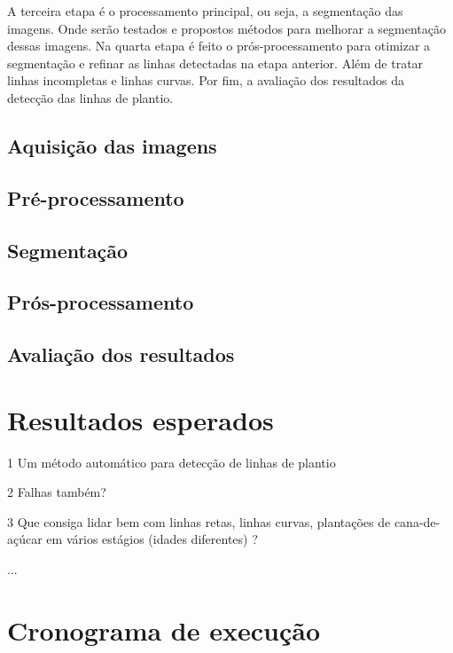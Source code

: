\documentclass[12pt, a4paper, english, brazil]{article}
\newcommand{\textBlue}[1]{{{\color{blue} #1}}}
\begin{document}
A terceira etapa é o processamento principal, ou seja, a segmentação das imagens. Onde serão testados e propostos métodos para melhorar a segmentação dessas imagens. Na quarta etapa é feito o prós-processamento para otimizar a segmentação e refinar as linhas detectadas na etapa anterior. Além de tratar linhas incompletas e linhas curvas. Por fim, a avaliação dos resultados da detecção das linhas de plantio.

\subsection{Aquisição das imagens}
\subsection{Pré-processamento}
\subsection{Segmentação}
\subsection{Prós-processamento}
\subsection{Avaliação dos resultados}

\section{Resultados esperados}

\textBlue{
1 Um método automático para detecção de linhas de plantio

2 Falhas também?

3 Que consiga lidar bem com linhas retas, linhas curvas, plantações de cana-de-açúcar em vários estágios (idades diferentes) ?

...
}


\section{Cronograma de execução}
\end{document}
